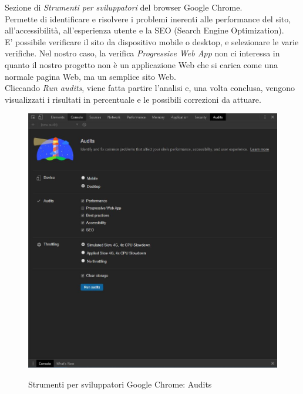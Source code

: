 Sezione di \emph{Strumenti per sviluppatori} del browser Google Chrome.\\
Permette di identificare e risolvere i problemi inerenti alle performance del sito, all'accessibilità, all'esperienza utente e la SEO (Search Engine Optimization).\\
E' possibile verificare il sito da dispositivo mobile o desktop, e selezionare le varie verifiche. Nel nostro caso, la verifica \emph{Progressive Web App} non ci interessa in quanto il nostro progetto non è un applicazione Web che si carica come una normale pagina Web, ma un semplice sito Web.\\
Cliccando \emph{Run audits}, viene fatta partire l'analisi e, una volta conclusa, vengono visualizzati i risultati in percentuale e le possibili correzioni da attuare.
\begin{figure}[!h]
	\centering
	\includegraphics[width=0.7\linewidth]{sezioni/FaseTest/Immagini/audits.JPG}\\
	\caption{Strumenti per sviluppatori Google Chrome: Audits}
	\label{Fig:audits}
\end{figure}

\newpage